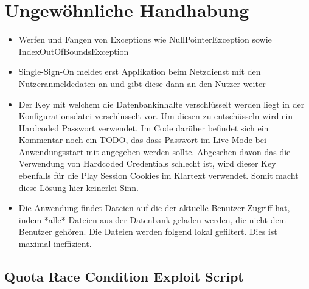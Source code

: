 \documentclass[12pt,DIV14,BCOR10mm,a4paper,parskip=half-,headsepline,headinclude,english,ngerman,bibliography=totocnumbered]{scrreprt}
\begin{document}
\chapter{Ungewöhnliche Handhabung}

\begin{itemize}
  \item Werfen und Fangen von Exceptions wie NullPointerException sowie IndexOutOfBoundsException
  \item Single-Sign-On meldet erst Applikation beim Netzdienst mit den Nutzeranmeldedaten an und gibt diese dann an den Nutzer weiter
  \item Der Key mit welchem die Datenbankinhalte verschlüsselt werden liegt in der Konfigurationsdatei verschlüsselt vor. Um diesen zu entschüsseln wird ein Hardcoded Passwort verwendet. Im Code darüber befindet sich ein Kommentar noch ein TODO, das dass Passwort im Live Mode bei Anwendungsstart mit angegeben werden sollte. Abgesehen davon das die Verwendung von Hardcoded Credentials schlecht ist, wird dieser Key ebenfalls für die Play Session Cookies im Klartext verwendet. Somit macht diese Lösung hier keinerlei Sinn.
  \item Die Anwendung findet Dateien auf die der aktuelle Benutzer Zugriff hat, indem *alle* Dateien aus der Datenbank geladen werden, die nicht dem Benutzer gehören. Die Dateien werden folgend lokal gefiltert. Dies ist maximal ineffizient.
\end{itemize}

\printbibliography

\printacronyms[title=Abkürzungsverzeichnis,toctitle=Abkürzungsverzeichnis]
\printglossary[title=Glossar,toctitle=Glossar,type=main]

\iftotalfigures
  \listoffigures
\fi


\begin{appendices}

\chapter{Quota Race Condition Exploit Script}
\label{quotarace}



\end{appendices}
\end{document}
